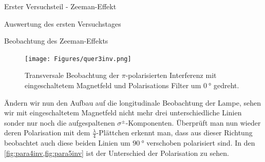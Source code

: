 \documentclass[pdftex, a4paper,11pt, twoside, ngerman]{report}
\begin{document}
\begin{chapter}{Erster Versuchsteil - Zeeman-Effekt}
\begin{section}{Auswertung des ersten Versuchstages}
\begin{subsection}{Beobachtung des Zeeman-Effekts}
\begin{figure}[ht]
\begin{minipage}{0.48\textwidth}
            \centering
            \texttt{[image: Figures/quer3inv.png]}
            \caption{Transversale Beobachtung der $\pi$-polarisierten
                Interferenz mit eingeschaltetem Magnetfeld und Polarisations
                Filter um $\SI{0}{\degree}$ gedreht.}
            \label{fig:quer3inv}
          \end{minipage}
        \end{figure}
        \newline
        Ändern wir nun den Aufbau auf die longitudinale Beobachtung der Lampe,
        sehen wir mit eingeschaltetem Magnetfeld nicht mehr drei
        unterschiedliche Linien sonder nur noch die aufgespaltenen
        $\sigma^{\pm}$-Komponenten. Überprüft man nun wieder deren Polarisation
        mit dem $\frac{\lambda}{4}$-Plättchen erkennt man, dass aus dieser
        Richtung beobachtet auch diese beiden Linien um $\SI{90}{\degree}$
        verschoben polarisiert sind. In den \cref{fig:para4inv,fig:para5inv}
        ist der Unterschied der Polarisation zu sehen.
        
        

\end{subsection}
\end{section}
\end{chapter}
\end{document}

